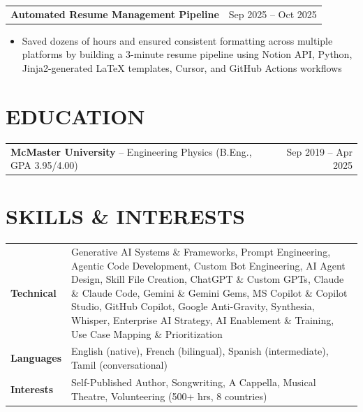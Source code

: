 \documentclass[a4paper,10pt]{article}
\begin{document}
\begin{tabularx}{\linewidth}{@{}X r@{}}
\begin{minipage}[t]{\linewidth}
  \textbf{Automated Resume Management Pipeline}
\end{minipage}
&     Sep 2025 -- Oct 2025
\end{tabularx}

\begin{itemize}[nosep,after=\strut, leftmargin=1em, itemsep=3pt,label=--]
  \item Saved dozens of hours and ensured consistent formatting across multiple platforms by building a 3-minute resume pipeline using Notion API, Python, Jinja2-generated LaTeX templates, Cursor, and GitHub Actions workflows
\end{itemize}


\section{EDUCATION}
\begin{tabularx}{\linewidth}{@{}X r@{}}
\begin{minipage}[t]{\linewidth}
  \textbf{McMaster University} -- Engineering Physics (B.Eng., GPA 3.95/4.00)
\end{minipage}
&     Sep 2019 -- Apr 2025
\end{tabularx}


\section{SKILLS \& INTERESTS}
\renewcommand{\arraystretch}{1.2} %
\begin{tabularx}{\linewidth}{@{}l X@{}}
\textbf{Technical} & \normalsize{Generative AI Systems \& Frameworks, Prompt Engineering, Agentic Code Development, Custom Bot Engineering, AI Agent Design, Skill File Creation, ChatGPT \& Custom GPTs, Claude \& Claude Code, Gemini \& Gemini Gems, MS Copilot \& Copilot Studio, GitHub Copilot, Google Anti-Gravity, Synthesia, Whisper, Enterprise AI Strategy, AI Enablement \& Training, Use Case Mapping \& Prioritization} \\
\textbf{Languages} & \normalsize{English (native), French (bilingual), Spanish (intermediate), Tamil (conversational)}\\
\textbf{Interests} & \normalsize{Self-Published Author, Songwriting, A Cappella, Musical Theatre, Volunteering (500+ hrs, 8 countries)}
\end{tabularx}
\end{document}
